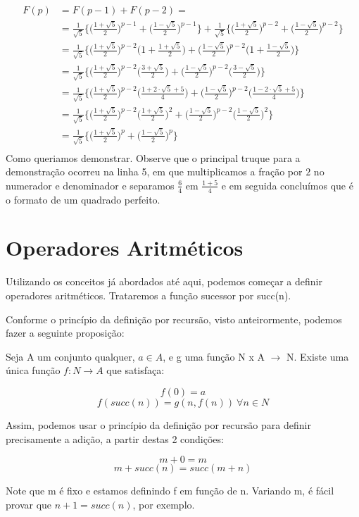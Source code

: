 \begin{align*}
    F(p) &= F(p-1) + F(p-2) = \\
    &= \frac{1}{\sqrt{5}}\bigg \{ \Big (\frac{1+\sqrt{5}}{2} \Big )^{p-1} + \Big (\frac{1-\sqrt{5}}{2}\Big )^{p-1}\bigg \} + \frac{1}{\sqrt{5}}\bigg \{ \Big (\frac{1+\sqrt{5}}{2} \Big )^{p-2} + \Big (\frac{1-\sqrt{5}}{2}\Big )^{p-2}\bigg \}\\
    &= \frac{1}{\sqrt{5}}\bigg \{ \Big (\frac{1+\sqrt{5}}{2} \Big )^{p-2} \Big( 1 + \frac{1+\sqrt{5}}{2}\Big) + \Big (\frac{1-\sqrt{5}}{2}\Big )^{p-2} \Big( 1 +\frac{1 - \sqrt{5}}{2}\Big)\bigg \}\\
     &= \frac{1}{\sqrt{5}}\bigg \{ \Big (\frac{1+\sqrt{5}}{2} \Big )^{p-2} \Big( \frac{3+\sqrt{5}}{2}\Big) + \Big (\frac{1-\sqrt{5}}{2}\Big )^{p-2} \Big( \frac{3 - \sqrt{5}}{2}\Big)\bigg \}\\
     &= \frac{1}{\sqrt{5}}\bigg \{ \Big (\frac{1+\sqrt{5}}{2} \Big )^{p-2} \Big( \frac{1+2\cdot \sqrt{5} + 5}{4}\Big) + \Big (\frac{1-\sqrt{5}}{2}\Big )^{p-2} \Big( \frac{1 - 2\cdot \sqrt{5} +5}{4}\Big)\bigg \}\\
     &= \frac{1}{\sqrt{5}}\bigg \{ \Big (\frac{1+\sqrt{5}}{2} \Big )^{p-2} \Big( \frac{1+\sqrt{5}}{2}\Big)^2 + \Big (\frac{1-\sqrt{5}}{2}\Big )^{p-2} \Big( \frac{1 - \sqrt{5}}{2}\Big)^2 \bigg \}\\
     &= \frac{1}{\sqrt{5}}\bigg \{ \Big (\frac{1+\sqrt{5}}{2} \Big )^p + \Big (\frac{1-\sqrt{5}}{2}\Big )^p\bigg \} \\
\end{align*}
Como queriamos demonstrar. Observe que o principal truque para a demonstração ocorreu na linha 5, 
em que multiplicamos a fração por $2$ no numerador e denominador e separamos $\frac{6}{4}$ em $\frac{1+5}{4}$
e em seguida concluímos que é o formato de um quadrado perfeito.

\section{Operadores Aritméticos}

Utilizando os conceitos já abordados até aqui, podemos começar a definir operadores aritméticos. Trataremos a função sucessor por succ(n).

Conforme o princípio da definição por recursão, visto anteirormente, podemos fazer a seguinte proposição:

Seja A um conjunto qualquer, $a \in A$, e g uma função N x A $\to$ N. Existe uma única função $f : N \to A$ que satisfaça: 
\begin{center}
\[f(0) = a\]
\[f(succ(n)) = g(n, f(n)) \ \forall n \in N\] 
\end{center}
Assim, podemos usar o princípio da definição por recursão para definir precisamente a adição, a partir destas 2 condições:
\begin{center}
\[m+0=m\]
\[m + succ(n) = succ(m +n)\] 
\end{center}
Note que m é fixo e estamos definindo f em função de n. Variando m, é fácil provar que $n + 1 = succ(n)$, por exemplo.

